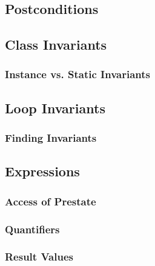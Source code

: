 \documentclass[a4paper, 11pt, accentcolor = tud3b]{tudreport}
\begin{document}
            \subsection{Postconditions} %

            \subsection{Class Invariants} %

                \subsubsection{Instance vs. Static Invariants} %

            \subsection{Loop Invariants} %

                \subsubsection{Finding Invariants} %

            \subsection{Expressions} %

                \subsubsection{Access of Prestate} %

                \subsubsection{Quantifiers} %

                \subsubsection{Result Values} %
\end{document}
